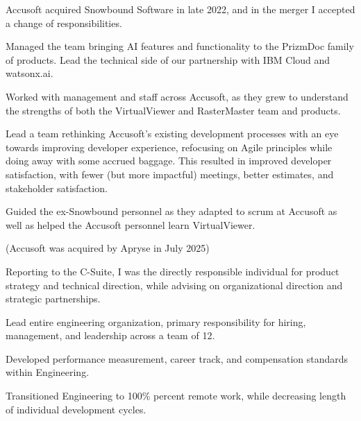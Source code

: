 \documentclass[letterpaper,10pt]{article}
\begin{document}
  \begin{resume_list}
    \item Accusoft acquired Snowbound Software in late 2022, and in the
        merger I accepted a change of responsibilities.
    \item Managed the team bringing AI features and functionality to the
        PrizmDoc family of products. Lead the technical side of our
        partnership with IBM Cloud and watsonx.ai.
    \item Worked with management and staff across Accusoft, as they grew to
        understand the strengths of both the VirtualViewer and RasterMaster
        team and products.
    \item Lead a team rethinking Accusoft's existing development processes
        with an eye towards improving developer experience, refocusing on
        Agile principles while doing away with some accrued baggage. This
        resulted in improved developer satisfaction, with fewer (but more
        impactful) meetings, better estimates, and stakeholder satisfaction.
    \item Guided the ex-Snowbound personnel as they adapted to scrum at
        Accusoft as well as helped the Accusoft personnel learn
        VirtualViewer.
    \item (Accusoft was acquired by Apryse in July 2025)
  \end{resume_list}

  \begin{resume_list}
    \item Reporting to the C-Suite, I was the directly responsible individual for product strategy and technical direction, while advising on organizational direction and strategic partnerships.
    \item Lead entire engineering organization, primary responsibility for hiring, management, and leadership across a team of 12.
    \item Developed performance measurement, career track, and compensation standards within Engineering.
    \item Transitioned Engineering to 100\% percent remote work, while decreasing length of individual development cycles.
  \end{resume_list}
     
\end{document}
